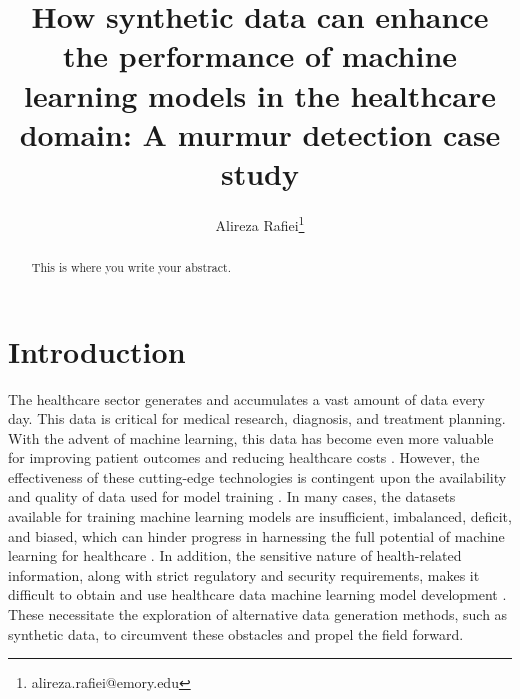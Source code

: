 \documentclass{article}
\date{}
\begin{document}
\title{\LARGE \bf
How synthetic data can enhance the performance of machine learning models in the healthcare domain: A murmur detection case study}


\author[1]{Alireza Rafiei\thanks{alireza.rafiei@emory.edu}}


\maketitle

\begin{abstract}
    This is where you write your abstract.
\end{abstract}



\section{Introduction}
The healthcare sector generates and accumulates a vast amount of data every day. This data is critical for medical research, diagnosis, and treatment planning. With the advent of machine learning, this data has become even more valuable for improving patient outcomes and reducing healthcare costs \cite{obermeyer2016predicting}. However, the effectiveness of these cutting-edge technologies is contingent upon the availability and quality of data used for model training \cite{rajkomar2019machine}. In many cases, the datasets available for training machine learning models are insufficient, imbalanced, deficit, and biased, which can hinder progress in harnessing the full potential of machine learning for healthcare \cite{johnson2016machine,dash2019big}. In addition, the sensitive nature of health-related information, along with strict regulatory and security requirements, makes it difficult to obtain and use healthcare data machine learning model development \cite{winter2019governance}. These necessitate the exploration of alternative data generation methods, such as synthetic data, to circumvent these obstacles and propel the field forward.
\end{document}
